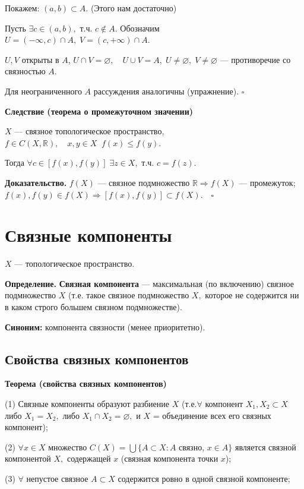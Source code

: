 \documentclass[12pt,a4paper]{article}
\begin{document}
Покажем: $(a, b) \subset A.$ (Этого нам достаточно)

Пусть $\exists c \in (a, b),$ т.ч. $c \not \in A.$ Обозначим $U = (-\infty, c) \cap A, \; V = (c, +\infty) \cap A.$

$U, V$ открыты в $A$, $U \cap V = \varnothing,\quad U \cup V = A, \; U \neq \varnothing, \; V \neq \varnothing$ --- противоречие со связностью $A$.

Для неограниченного $A$ рассуждения аналогичны (упражнение). $\square$

\textbf{Следствие (теорема о промежуточном значении)}

$X$ --- связное топологическое пространство, $f \in C(X, \mathbb{R}), \quad x, y \in X \;\; f(x) \leq f(y).$

Тогда $\forall c \in [f(x), f(y)] \; \exists z \in X,$ т.ч. $c = f(z).$

\textbf{Доказательство.} $f(X)$ --- связное подмножество $\mathbb{R} \Rightarrow f(X)$ --- промежуток; $f(x), f(y) \in f(X) \Rightarrow [f(x), f(y)] \subset f(X). \quad \square$

\section{Связные компоненты}

$X$ --- топологическое пространство. 

\textbf{Определение.} \textbf{Связная компонента} --- максимальная (по включению) связное подмножество $X$ (т.е. такое связное подмножество $X,$ которое не содержится ни в каком строго большем связном подмножестве).

\textbf{Синоним:} компонента связности (менее приоритетно).

\subsection{Свойства связных компонентов}

\textbf{Теорема (свойства связных компонентов)}

(1) Связные компоненты образуют разбиение $X$ (т.е.$\forall$ компонент $X_{1}, X_{2} \subset X$ либо $X_{1} = X_{2},$ либо $X_{1} \cap X_{2} = \varnothing,$ и $X$ = объединение всех его связных компонент);

(2) $\forall x \in X$ множество $C(X) = \bigcup \{A \subset X\!: A$ связно, $x \in A\}$ является связной компонентой $X,$ содержащей $x$ (связная компонента точки $x$);

(3) $\forall$ непустое связное $A \subset X$ содержится ровно в одной связной компоненте;
\end{document}
